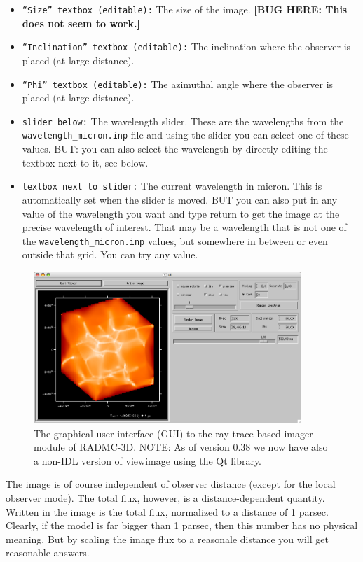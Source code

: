 \documentclass{report}
\begin{document}
\begin{itemize}
\item {\small\tt ``Size'' textbox (editable):} The size of the image.
{\bf [BUG HERE: This does not seem to work.]}
\item {\small\tt ``Inclination'' textbox (editable):} The inclination where the
  observer is placed (at large distance).
\item {\small\tt ``Phi'' textbox (editable):} The azimuthal angle where the
  observer is placed (at large distance). 
\item {\small\tt slider below:} The wavelength slider. These are the wavelengths
  from the {\small\tt wavelength\_micron.inp} file and using the slider you can
  select one of these values. BUT: you can also select the wavelength by
  directly editing the textbox next to it, see below.
\item {\small\tt textbox next to slider:} The current wavelength in micron. This
  is automatically set when the slider is moved. BUT you can also put in 
  any value of the wavelength you want and type return to get the image at
  the precise wavelength of interest. That may be a wavelength that is not
  one of the {\small\tt wavelength\_micron.inp} values, but somewhere in between
  or even outside that grid. You can try any value. 
\end{itemize}
%
\begin{figure}
\centerline{\includegraphics[width=0.9\textwidth]{gui.eps}}
\caption{\label{fig-gui-screenshot}
The graphical user interface (GUI) to the ray-trace-based imager
module of RADMC-3D. NOTE: As of version 0.38 we now have also 
a non-IDL version of viewimage using the Qt library.}
\end{figure}
%

The image is of course independent of observer distance (except for the
local observer mode). The total flux, however, is a distance-dependent
quantity. Written in the image is the total flux, normalized to a distance
of 1 parsec. Clearly, if the model is far bigger than 1 parsec, then this
number has no physical meaning. But by scaling the image flux to a reasonale
distance you will get reasonable answers.
\end{document}
